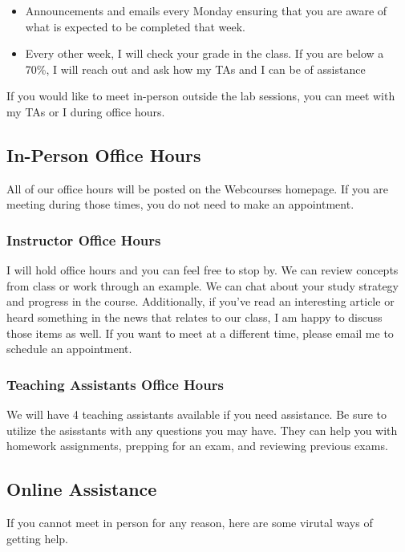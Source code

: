 \documentclass[11pt]{paper}
\begin{document}
\begin{itemize}
	\item Announcements and emails every Monday ensuring that you are aware of what is expected to be completed that week.
	\item Every other week, I will check your grade in the class. If you are below a 70\%, I will reach out and ask how my TAs and I can be of assistance
\end{itemize}

If you would like to meet in-person outside the lab sessions, you can meet with my TAs or I during office hours. 

\subsection{In-Person Office Hours}

All of our office hours will be posted on the Webcourses homepage. If you are meeting during those times, you do not need to make an appointment.

\subsubsection{Instructor Office Hours}

I will hold office hours and you can feel free to stop by. We can review concepts from class or work through an example. We can chat about your study strategy and progress in the course. Additionally, if you’ve read an interesting article or heard something in the news that relates to our class, I am happy to discuss those items as well. If you want to meet at a different time, please email me to schedule an appointment. 

\subsubsection{Teaching Assistants Office Hours}

We will have 4 teaching assistants available if you need assistance. Be sure to utilize the asisstants with any questions you may have. They can help you with homework assignments, prepping for an exam, and reviewing previous exams. 

\subsection{Online Assistance}

If you cannot meet in person for any reason, here are some virutal ways of getting help.
\end{document}
